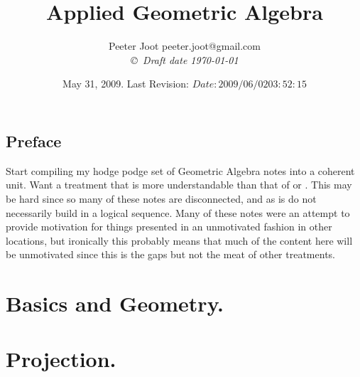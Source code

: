 \documentclass[12pt,leqno]{book}
\title{Applied Geometric Algebra}
\author{Peeter Joot  \quad peeter.joot@gmail.com \\
{\small\em \copyright \  Draft date \today }}
\date{ May 31, 2009.  Last Revision: $Date: 2009/06/02 03:52:15 $ }
\begin{document}
\maketitle
\tableofcontents
\listoffigures
\listoftables
\chapter*{Preface}\normalsize
\pagestyle{plain}

Start compiling my hodge podge set of Geometric Algebra notes into a coherent unit.  Want a treatment that is more
understandable than that of 
\cite{doran2003gap} or 
\cite{hestenes1999nfc}.
This may be hard since so many of these notes are disconnected, and as
is do not necessarily build in a logical sequence.  Many of these 
notes were an attempt to provide motivation for things presented in
an unmotivated fashion in other locations, but ironically this probably
means that much of the content here will be unmotivated since this 
is the gaps but not the meat of other treatments.

%

\pagestyle{headings}


\part{Basics and Geometry.}















\part{Projection.}






\end{document}
